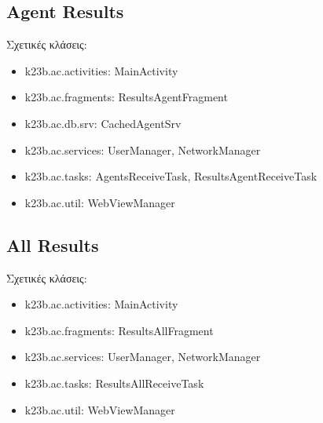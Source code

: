 \documentclass[a4paper,11pt]{article}
\begin{document}
\begin{sloppypar}
\begin{itemize}
\end{itemize}

\subsection{Agent Results}

Σχετικές κλάσεις:

\begin{itemize}

\item k23b.ac.activities: MainActivity

\item k23b.ac.fragments: ResultsAgentFragment

\item k23b.ac.db.srv: CachedAgentSrv

\item k23b.ac.services: UserManager, NetworkManager

\item k23b.ac.tasks: AgentsReceiveTask, ResultsAgentReceiveTask

\item k23b.ac.util: WebViewManager

\end{itemize}

\subsection{All Results}

Σχετικές κλάσεις:

\begin{itemize}

\item k23b.ac.activities: MainActivity

\item k23b.ac.fragments: ResultsAllFragment

\item k23b.ac.services: UserManager, NetworkManager

\item k23b.ac.tasks: ResultsAllReceiveTask

\item k23b.ac.util: WebViewManager

\end{itemize}


\end{sloppypar}
\end{document}
